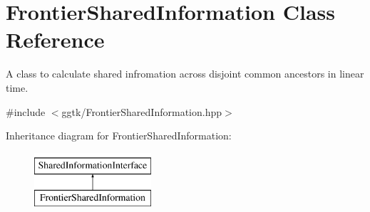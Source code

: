 \hypertarget{classFrontierSharedInformation}{}\section{Frontier\+Shared\+Information Class Reference}
\label{classFrontierSharedInformation}


A class to calculate shared infromation across disjoint common ancestors in linear time.  




{\ttfamily \#include $<$ggtk/\+Frontier\+Shared\+Information.\+hpp$>$}

Inheritance diagram for Frontier\+Shared\+Information\+:\begin{figure}[H]
\begin{center}
\leavevmode
\includegraphics[height=2.000000cm]{classFrontierSharedInformation}
\end{center}
\end{figure}
